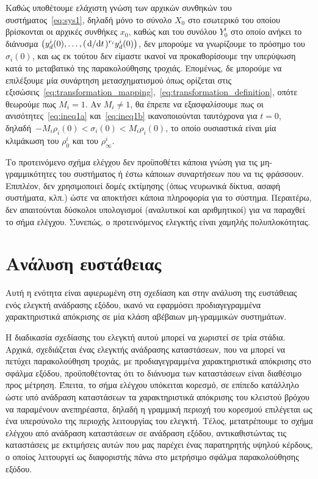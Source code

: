\begin{remark}
    \label{remark:overshoot}
     Καθώς υποθέτουμε ελάχιστη γνώση των αρχικών συνθηκών του συστήματος~\eqref{eq:sys1}, δηλαδή μόνο το σύνολο $X_0$ στο εσωτερικό του οποίου βρίσκονται οι αρχικές συνθήκες $x_0$, καθώς και του συνόλου $Y_0^i$ στο οποίο ανήκει το διάνυσμα $\pqty{y_d^i(0), \ldots, (\dv*{}{t})^{r_i} y_d^i(0)}$, δεν μπορούμε να γνωρίζουμε το πρόσημο του $\sigma_i(0)$, και ως εκ τούτου δεν είμαστε ικανοί να προκαθορίσουμε την υπερύψωση κατά το μεταβατικό της παρακολούθησης τροχιάς. Επομένως, δε μπορούμε να επιλέξουμε μία συνάρτηση μετασχηματισμού όπως ορίζεται στις εξισώσεις~\eqref{eq:transformation_mapping},~\eqref{eq:transformation_definition}, οπότε θεωρούμε πως $M_i =1$. Αν $M_i \neq 1$, θα έπρεπε να εξασφαλίσουμε πως οι ανισότητες~\eqref{eq:ineq1a} και~\eqref{eq:ineq1b} ικανοποιούνται ταυτόχρονα για $t = 0$, δηλαδή\ $-M_i\rho_i(0) < \sigma_i(0) < M_i\rho_i(0)$, το οποίο ουσιαστικά είναι μία κλιμάκωση του $\rho_0^i$ και του $\rho_\infty^i$.
\end{remark}

\begin{remark}
    \label{remark:complexity}
    Το προτεινόμενο σχήμα ελέγχου δεν προϋποθέτει κάποια γνώση για τις μη-γραμμικότητες του συστήματος ή έστω κάποιων συναρτήσεων που να τις φράσσουν. Επιπλέον, δεν χρησιμοποιεί δομές εκτίμησης (όπως νευρωνικά δίκτυα, ασαφή συστήματα, κλπ.) ώστε να αποκτήσει κάποια πληροφορία για το σύστημα. Περαιτέρω, δεν απαιτούνται δύσκολοι υπολογισμοί (αναλυτικοί και αριθμητικοί) για να παραχθεί το σήμα ελέγχου. Συνεπώς, ο προτεινόμενος ελεγκτής είναι χαμηλής πολυπλοκότητας.
\end{remark}

\section{Ανάλυση ευστάθειας}
\label{section:stability}

Αυτή η ενότητα είναι αφιερωμένη στη σχεδίαση και στην ανάλυση της ευστάθειας ενός ελεγκτή ανάδρασης εξόδου, ικανό να εφαρμόσει προδιαγεγραμμένα χαρακτηριστικά απόκρισης σε μία κλάση αβέβαιων μη-γραμμικών συστημάτων.

Η διαδικασία σχεδίασης του ελεγκτή αυτού μπορεί να χωριστεί σε τρία στάδια. Αρχικά, σχεδιάζεται ένας ελεγκτής ανάδρασης καταστάσεων, που να μπορεί να πετύχει παρακολούθηση τροχιάς, με προδιαγεγραμμένα χαρακτηριστικά απόκρισης στο σφάλμα εξόδου, προϋποθέτοντας ότι το διάνυσμα των καταστάσεων είναι διαθέσιμο προς μέτρηση. Έπειτα, το σήμα ελέγχου υπόκειται κορεσμό, σε επίπεδο κατάλληλο ώστε υπό ανάδραση καταστάσεων τα χαρακτηριστικά απόκρισης του κλειστού βρόχου να παραμένουν ανεπηρέαστα, δηλαδή η γραμμική περιοχή του κορεσμού επιλέγεται ως ένα υπερσύνολο της περιοχής λειτουργίας του ελεγκτή. Τέλος, μετατρέπουμε το σχήμα ελέγχου από ανάδραση καταστάσεων σε ανάδραση εξόδου, αντικαθιστώντας τις καταστάσεις με εκτιμήσεις αυτών που μας παρέχει ένας παρατηρητής υψηλού κέρδους, ο οποίος λειτουργεί ως διαφοριστής πάνω στο μετρήσιμο σφάλμα παρακολούθησης εξόδου.

